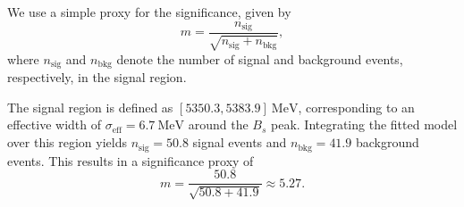 We use a simple proxy for the significance, 
given by
\begin{equation}
    m = \frac{n_{\text{sig}}}{\sqrt{n_{\text{sig}} + n_{\text{bkg}}}},
\end{equation}
where $n_{\text{sig}}$ and $n_{\text{bkg}}$ denote the number of signal and background events, 
respectively, 
in the signal region.

The signal region is defined as $[5350.3, 5383.9]~\text{MeV}$, 
corresponding to an effective width of $\sigma_{\text{eff}} = 6.7~\text{MeV}$ around the $B_s$ peak. 
Integrating the fitted model over this region yields $n_{\text{sig}} = 50.8$ signal events and $n_{\text{bkg}} = 41.9$ background events. 
This results in a significance proxy of
\begin{equation}
    m = \frac{50.8}{\sqrt{50.8 + 41.9}} \approx 5.27.
\end{equation}